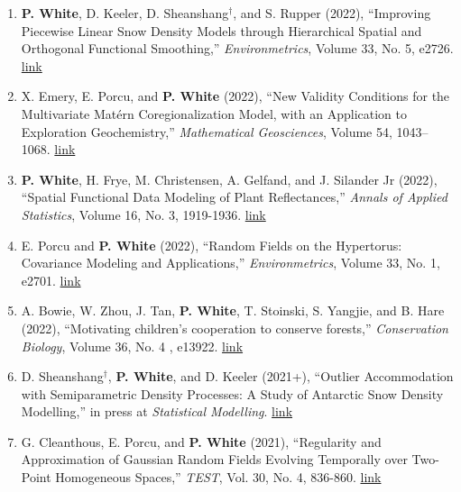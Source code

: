 \documentclass[11pt]{article}
\begin{document}
\begin{enumerate}[label=$\bullet$]
\item \textbf{P. White}, D. Keeler, D. Sheanshang$^\dagger$, and S. Rupper (2022), ``Improving Piecewise Linear Snow Density Models through Hierarchical Spatial and Orthogonal Functional Smoothing,'' \emph{Environmetrics}, Volume 33, No. 5, e2726. \href{http://doi.org/10.1002/env.2726}{link}

\item X. Emery, E. Porcu, and \textbf{P. White} (2022), ``New Validity Conditions for the Multivariate Mat\'ern Coregionalization Model, with an Application to Exploration Geochemistry,'' \emph{Mathematical Geosciences}, Volume 54, 1043–1068. \href{https://link.springer.com/article/10.1007/s11004-022-10000-6}{link} 



\item \textbf{P. White}, H. Frye, M. Christensen, A. Gelfand, and J. Silander Jr (2022), ``Spatial Functional Data Modeling of Plant Reflectances,'' \emph{Annals of Applied Statistics}, Volume 16, No. 3, 1919-1936. \href{http://dx.doi.org/10.1214/21-AOAS1576}{link}


\item  E. Porcu and \textbf{P. White} (2022), ``Random Fields on the Hypertorus: Covariance Modeling and Applications,'' \emph{Environmetrics}, Volume 33, No. 1, e2701. \href{https://doi.org/10.1002/env.2701}{link}


 \item A. Bowie, W. Zhou,  J. Tan, \textbf{P. White}, T. Stoinski, S. Yangjie, and B. Hare (2022), ``Motivating children's cooperation to conserve forests,'' \emph{Conservation Biology}, Volume 36, No. 4 , e13922. \href{https://conbio.onlinelibrary.wiley.com/doi/10.1111/cobi.13922}{link}
 
 

\item D. Sheanshang$^\dagger$, \textbf{P. White}, and D. Keeler (2021+), ``Outlier Accommodation with Semiparametric Density Processes: A Study of Antarctic Snow Density Modelling,'' in press at \emph{Statistical Modelling}. \href{https://doi.org/10.1177/1471082X211043946}{link}


\item G. Cleanthous, E. Porcu, and \textbf{P. White} (2021), ``Regularity and Approximation of Gaussian Random Fields Evolving Temporally over Two-Point Homogeneous Spaces,'' \textit{TEST}, Vol. 30, No. 4, 836-860.  \href{https://link.springer.com/article/10.1007/s11749-021-00755-1}{link}



\end{enumerate}
\end{document}
